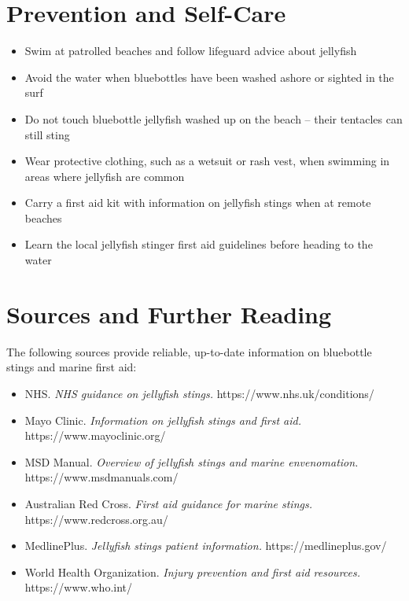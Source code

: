 \section*{Prevention and Self-Care}
\begin{itemize}
    \item Swim at patrolled beaches and follow lifeguard advice about jellyfish
    \item Avoid the water when bluebottles have been washed ashore or sighted in the surf
    \item Do not touch bluebottle jellyfish washed up on the beach -- their tentacles can still sting
    \item Wear protective clothing, such as a wetsuit or rash vest, when swimming in areas where jellyfish are common
    \item Carry a first aid kit with information on jellyfish stings when at remote beaches
    \item Learn the local jellyfish stinger first aid guidelines before heading to the water
\end{itemize}

\section*{Sources and Further Reading}
The following sources provide reliable, up-to-date information on bluebottle stings and marine first aid:

\begin{itemize}
    \item NHS. \textit{NHS guidance on jellyfish stings.} https://www.nhs.uk/conditions/
    \item Mayo Clinic. \textit{Information on jellyfish stings and first aid.} https://www.mayoclinic.org/
    \item MSD Manual. \textit{Overview of jellyfish stings and marine envenomation.} https://www.msdmanuals.com/
    \item Australian Red Cross. \textit{First aid guidance for marine stings.} https://www.redcross.org.au/
    \item MedlinePlus. \textit{Jellyfish stings patient information.} https://medlineplus.gov/
    \item World Health Organization. \textit{Injury prevention and first aid resources.} https://www.who.int/
\end{itemize}
